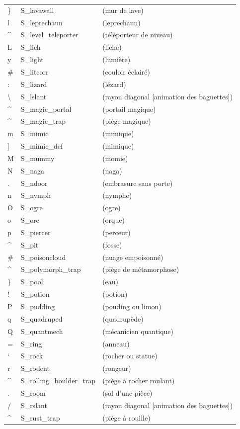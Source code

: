 \documentclass[titlepage]{article}
\begin{document}
\begin{longtable}{lll}
\} & S\_lavawall & (mur de lave)\\
l & S\_leprechaun & (leprechaun)\\
\textasciicircum{} & S\_level\_teleporter & (téléporteur de niveau)\\
L & S\_lich & (liche)\\
y & S\_light & (lumière)\\
\# & S\_litcorr & (couloir éclairé)\\
: & S\_lizard & (lézard)\\
\textbackslash{} & S\_lslant & (rayon diagonal [animation des baguettes])\\
\textasciicircum{} & S\_magic\_portal & (portail magique)\\
\textasciicircum{} & S\_magic\_trap & (piège magique)\\
m & S\_mimic & (mimique)\\
] & S\_mimic\_def & (mimique)\\
M & S\_mummy & (momie)\\
N & S\_naga & (naga)\\
. & S\_ndoor & (embrasure sans porte)\\
n & S\_nymph & (nymphe)\\
O & S\_ogre & (ogre)\\
o & S\_orc & (orque)\\
p & S\_piercer & (perceur)\\
\textasciicircum{} & S\_pit & (fosse)\\
\# & S\_poisoncloud & (nuage empoisonné)\\
\textasciicircum{} & S\_polymorph\_trap & (piège de métamorphose)\\
\} & S\_pool & (eau)\\
! & S\_potion & (potion)\\
P & S\_pudding & (pouding ou limon)\\
q & S\_quadruped & (quadrupède)\\
Q & S\_quantmech & (mécanicien quantique)\\
= & S\_ring & (anneau)\\
` & S\_rock & (rocher ou statue)\\
r & S\_rodent & (rongeur)\\
\textasciicircum{} & S\_rolling\_boulder\_trap & (piège à rocher roulant)\\
. & S\_room & (sol d'une pièce)\\
/ & S\_rslant & (rayon diagonal [animation des baguettes])\\
\textasciicircum{} & S\_rust\_trap & (piège à rouille)\\

\end{longtable}
\end{document}
